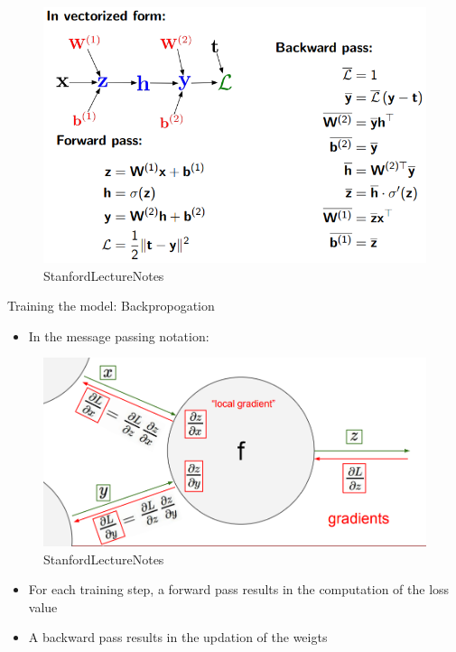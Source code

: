 \documentclass[11pt]{article}
\makeatletter
\def\maxwidth{\ifdim\Gin@nat@width>\linewidth\linewidth
    \else\Gin@nat@width\fi}
\let\Oldincludegraphics\includegraphics
\renewcommand{\includegraphics}[1]{\Oldincludegraphics[width=.8\maxwidth]{#1}}
\providecommand{\tightlist}{%
      \setlength{\itemsep}{0pt}\setlength{\parskip}{0pt}}
\makeatother
\begin{document}
\begin{figure}
\centering
\includegraphics{pres_imgs/back_prop_mlpc_vectorized.png}
\caption{StanfordLectureNotes}
\end{figure}

    Training the model: Backpropogation

\begin{itemize}
\tightlist
\item
  In the message passing notation:
\end{itemize}

\begin{figure}
\centering
\includegraphics{pres_imgs/back-prop.png}
\caption{StanfordLectureNotes}
\end{figure}

\begin{itemize}
\tightlist
\item
  For each training step, a forward pass results in the computation of
  the loss value
\item
  A backward pass results in the updation of the weigts
\end{itemize}
\end{document}
